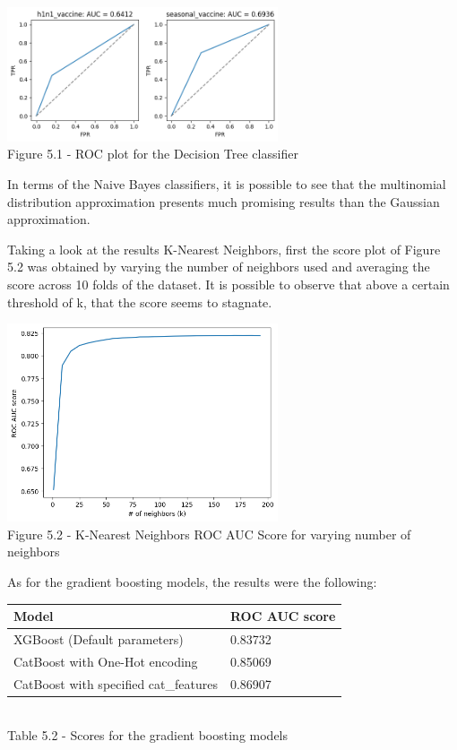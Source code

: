 \documentclass{IEEEtran}
\begin{document}
\begin{center}
    \includegraphics[width=8cm]{figures/decisionTreeROC.png}\\
    Figure 5.1 - ROC plot for the Decision Tree classifier
\end{center}

In terms of the Naive Bayes classifiers, it is possible to see that the multinomial distribution approximation presents much promising results than the Gaussian approximation.

Taking a look at the results K-Nearest Neighbors, first the score plot of Figure 5.2 was obtained by varying the number of neighbors used and averaging the score across 10 folds of the dataset. It is possible to observe that above a certain threshold of k, that the score seems to stagnate.

\vfill

\begin{center}
    \includegraphics[width=8cm]{figures/KNN_score.png}\\
    Figure 5.2 - K-Nearest Neighbors ROC AUC Score for varying number of neighbors
\end{center}

As for the gradient boosting models, the results were the following:

\begin{center}
    \begin{tabular}{|l|l|}
        \hline
    \textbf{Model} & \textbf{ROC AUC score} \\ 
    \hline \hline
    XGBoost (Default parameters) & 0.83732 \\ \hline
    CatBoost with One-Hot encoding & 0.85069 \\ \hline
    CatBoost with specified cat\_features & 0.86907 \\ \hline
    \end{tabular}\\
    
    \vspace{6pt}
    Table 5.2 - Scores for the gradient boosting models
\end{center}
\end{document}
